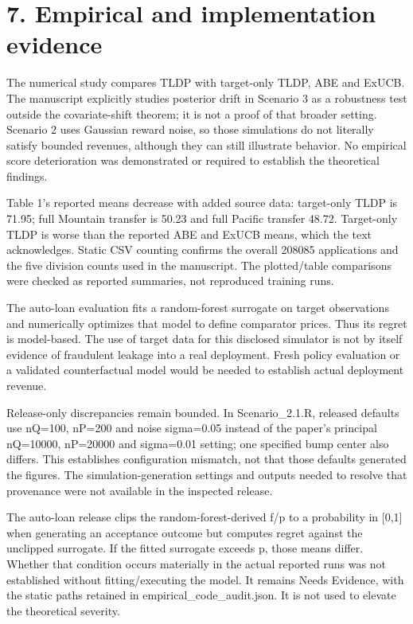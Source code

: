 \documentclass[10pt]{article}
\begin{document}
\section*{7. Empirical and implementation evidence}
The numerical study compares TLDP with target-only TLDP, ABE and ExUCB. The manuscript explicitly studies posterior drift in Scenario 3 as a robustness test outside the covariate-shift theorem; it is not a proof of that broader setting. Scenario 2 uses Gaussian reward noise, so those simulations do not literally satisfy bounded revenues, although they can still illustrate behavior. No empirical score deterioration was demonstrated or required to establish the theoretical findings.\par
Table 1’s reported means decrease with added source data: target-only TLDP is 71.95; full Mountain transfer is 50.23 and full Pacific transfer 48.72. Target-only TLDP is worse than the reported ABE and ExUCB means, which the text acknowledges. Static CSV counting confirms the overall 208085 applications and the five division counts used in the manuscript. The plotted/table comparisons were checked as reported summaries, not reproduced training runs.\par
The auto-loan evaluation fits a random-forest surrogate on target observations and numerically optimizes that model to define comparator prices. Thus its regret is model-based. The use of target data for this disclosed simulator is not by itself evidence of fraudulent leakage into a real deployment. Fresh policy evaluation or a validated counterfactual model would be needed to establish actual deployment revenue.\par
Release-only discrepancies remain bounded. In Scenario\_2.1.R, released defaults use nQ=100, nP=200 and noise sigma=0.05 instead of the paper’s principal nQ=10000, nP=20000 and sigma=0.01 setting; one specified bump center also differs. This establishes configuration mismatch, not that those defaults generated the figures. The simulation-generation settings and outputs needed to resolve that provenance were not available in the inspected release.\par
The auto-loan release clips the random-forest-derived f/p to a probability in [0,1] when generating an acceptance outcome but computes regret against the unclipped surrogate. If the fitted surrogate exceeds p, those means differ. Whether that condition occurs materially in the actual reported runs was not established without fitting/executing the model. It remains Needs Evidence, with the static paths retained in empirical\_code\_audit.json. It is not used to elevate the theoretical severity.\par
\end{document}
